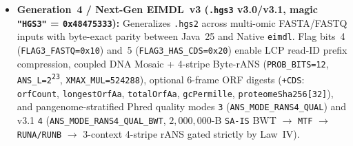 \documentclass[10pt]{article}
\theoremstyle{definition}
\begin{document}
\begin{itemize}
  \item \textbf{Generation~4 / Next-Gen EIMDL~v3 (\texttt{.hgs3} v3.0/v3.1, magic \texttt{"HGS3"} = \texttt{0x48475333}):} Generalizes \texttt{.hgs2} across multi-omic FASTA/FASTQ inputs with byte-exact parity between Java~25 and Native \texttt{eimdl}. Flag bits~4 (\texttt{FLAG3\_FASTQ=0x10}) and~5 (\texttt{FLAG3\_HAS\_CDS=0x20}) enable LCP read-ID prefix compression, coupled DNA Mosaic + 4-stripe Byte-rANS (\texttt{PROB\_BITS=12}, \texttt{ANS\_L=2\textsuperscript{23}}, \texttt{XMAX\_MUL=524288}), optional 6-frame ORF digests (\texttt{+CDS}: \texttt{orfCount}, \texttt{longestOrfAa}, \texttt{totalOrfAa}, \texttt{gcPermille}, \texttt{proteomeSha256[32]}), and pangenome-stratified Phred quality modes \texttt{3} (\texttt{ANS\_MODE\_RANS4\_QUAL}) and v3.1 \texttt{4} (\texttt{ANS\_MODE\_RANS4\_QUAL\_BWT}, $2{,}000{,}000$-B \texttt{SA-IS} BWT $\to$ \texttt{MTF} $\to$ \texttt{RUNA/RUNB} $\to$ 3-context 4-stripe rANS gated strictly by Law~IV).
\end{itemize}
\end{document}

